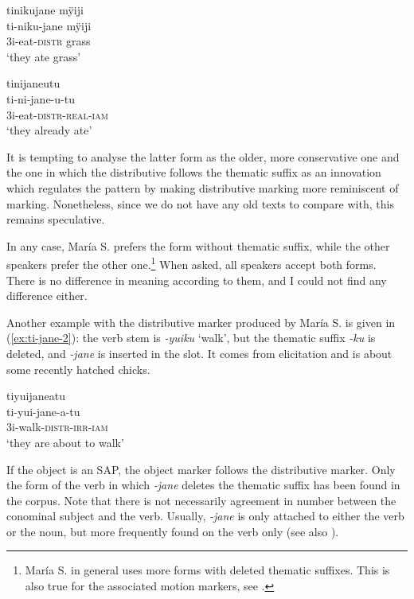 \ea\label{ex:jane-eat-1}
\begingl
\glpreamble tinikujane mÿiji\\
\gla ti-niku-jane mÿiji\\
\glb 3i-eat-\textsc{distr} grass\\
\glft ‘they ate grass’
\trailingcitation{[jxx-e150925l-1.115]}
\xe

\ea\label{ex:jane-eat-2}
\begingl
\glpreamble tinijaneutu\\
\gla ti-ni-jane-u-tu\\
\glb 3i-eat-\textsc{distr}-\textsc{real}-\textsc{iam}\\
\glft ‘they already ate’
\endgl
\trailingcitation{[rxx-e141230s.038]}
\xe

It is tempting to analyse the latter form as the older, more conservative one and the one in which the distributive follows the thematic suffix as an innovation which regulates the pattern by making distributive marking more reminiscent of  marking. Nonetheless, since we do not have any old texts to compare with, this remains speculative.

In any case, María S. prefers the form without thematic suffix, while the other speakers prefer the other one.\footnote{María S. in general uses more forms with deleted thematic suffixes. This is also true for the associated motion markers, see .} When asked, all speakers accept both forms. There is no difference in meaning according to them, and I could not find any difference either. 

Another example with the distributive marker produced by María S. is given in (\ref{ex:ti-jane-2}): the verb stem is \textit{-yuiku} ‘walk’, but the thematic suffix \textit{-ku} is deleted, and \textit{-jane} is inserted in the slot. It comes from elicitation and is about some recently hatched chicks.

\ea\label{ex:ti-jane-2}
\begingl 
\glpreamble tiyuijaneatu\\
\gla ti-yui-jane-a-tu\\ 
\glb 3i-walk-\textsc{distr}-\textsc{irr}-\textsc{iam}\\ 
\glft ‘they are about to walk’
\trailingcitation{[rxx-e121128s-1.035]}
\xe


If the object is an SAP, the object marker follows the distributive marker. Only the form of the verb in which \textit{-jane} deletes the thematic suffix has been found in the corpus. Note that there is not necessarily agreement in number between the conominal subject and the verb. Usually, \textit{-jane} is only attached to either the verb or the noun, but more frequently found on the verb only (see also ). 


